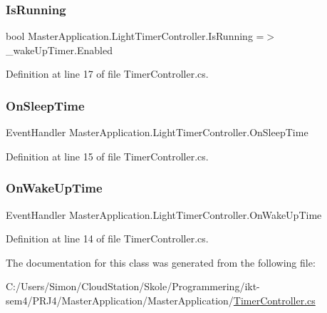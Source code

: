 \subsubsection{\texorpdfstring{Is\+Running}{IsRunning}}
{\footnotesize\ttfamily bool Master\+Application.\+Light\+Timer\+Controller.\+Is\+Running =$>$ \+\_\+wake\+Up\+Timer.\+Enabled\hspace{0.3cm}{\ttfamily [static]}}



Definition at line 17 of file Timer\+Controller.\+cs.

\mbox{\label{class_master_application_1_1_light_timer_controller_ad04b63eea25e1d7c00edeb428d12d90f}} 
\subsubsection{\texorpdfstring{On\+Sleep\+Time}{OnSleepTime}}
{\footnotesize\ttfamily Event\+Handler Master\+Application.\+Light\+Timer\+Controller.\+On\+Sleep\+Time\hspace{0.3cm}{\ttfamily [static]}}



Definition at line 15 of file Timer\+Controller.\+cs.

\mbox{\label{class_master_application_1_1_light_timer_controller_a34e6c8f85b2c8e61b1967cceccc3e0e4}} 
\subsubsection{\texorpdfstring{On\+Wake\+Up\+Time}{OnWakeUpTime}}
{\footnotesize\ttfamily Event\+Handler Master\+Application.\+Light\+Timer\+Controller.\+On\+Wake\+Up\+Time\hspace{0.3cm}{\ttfamily [static]}}



Definition at line 14 of file Timer\+Controller.\+cs.



The documentation for this class was generated from the following file\+:\begin{DoxyCompactItemize}
\item 
C\+:/\+Users/\+Simon/\+Cloud\+Station/\+Skole/\+Programmering/ikt-\/sem4/\+P\+R\+J4/\+Master\+Application/\+Master\+Application/\mbox{\hyperlink{_timer_controller_8cs}{Timer\+Controller.\+cs}}\end{DoxyCompactItemize}
